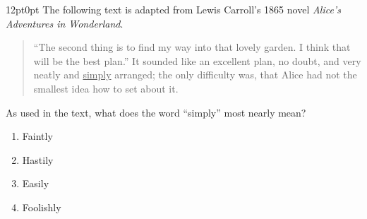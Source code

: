 \documentclass[11pt, twocolumn]{article}
\newcounter{questionnum}
\begin{document}
\vspace{6pt}\noindent
\begin{minipage}{\columnwidth}\raggedright
\noindent{}\par\vspace{8pt}
\begin{adjustwidth}{12pt}{0pt}
The following text is adapted from Lewis Carroll's 1865 novel \textit{Alice's Adventures in Wonderland}.

\vspace{6pt}
\begin{quote}

``The second thing is to find my way into that lovely garden. I think that will be the best plan.'' It sounded like an excellent plan, no doubt, and very neatly and \uline{simply} arranged; the only difficulty was, that Alice had not the smallest idea how to set about it.

\end{quote}
\vspace{6pt}

As used in the text, what does the word ``simply'' most nearly mean?
\begin{enumerate}[label=\Alph*),leftmargin=18pt,topsep=3pt,itemsep=2pt]
  \item Faintly
  \item Hastily
  \item Easily
  \item Foolishly
\end{enumerate}
\end{adjustwidth}
\end{minipage}\par
\end{document}
